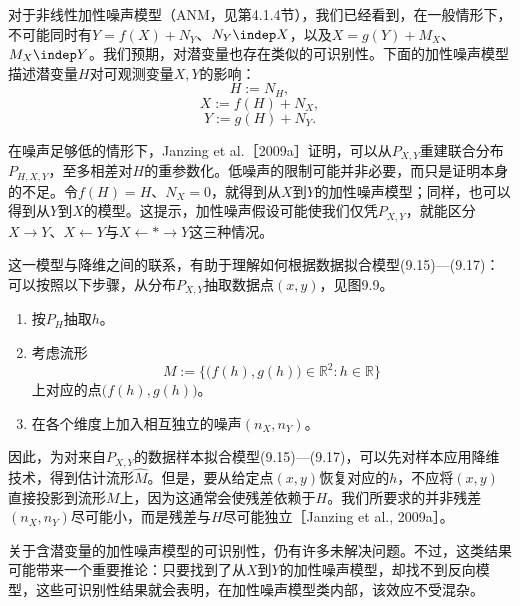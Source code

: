对于非线性加性噪声模型（ANM，见第4.1.4节），我们已经看到，在一般情形下，不可能同时有$Y=f(X)+N_Y$、$N_Y\indep X$，以及$X=g(Y)+M_X$、$M_X\indep Y$。我们预期，对潜变量也存在类似的可识别性。下面的加性噪声模型描述潜变量$H$对可观测变量$X,Y$的影响：
\begin{equation}
 H:=N_H,\tag{9.15}
\end{equation}
\begin{equation}
 X:=f(H)+N_X,\tag{9.16}
\end{equation}
\begin{equation}
 Y:=g(H)+N_Y.\tag{9.17}
\end{equation}

在噪声足够低的情形下，Janzing et al.［2009a］证明，可以从$P_{X,Y}$重建联合分布$P_{H,X,Y}$，至多相差对$H$的重参数化。低噪声的限制可能并非必要，而只是证明本身的不足。令$f(H)=H$、$N_X=0$，就得到从$X$到$Y$的加性噪声模型；同样，也可以得到从$Y$到$X$的模型。这提示，加性噪声假设可能使我们仅凭$P_{X,Y}$，就能区分$X\to Y$、$X\leftarrow Y$与$X\leftarrow *\to Y$这三种情况。

这一模型与降维之间的联系，有助于理解如何根据数据拟合模型(9.15)—(9.17)：可以按照以下步骤，从分布$P_{X,Y}$抽取数据点$(x,y)$，见图9.9。
\begin{enumerate}[label=\arabic*.]
 \item 按$P_H$抽取$h$。
 \item 考虑流形
 \begin{equation}
 M:=\bigl\{\bigl(f(h),g(h)\bigr)\in\mathbb R^2:h\in\mathbb R\bigr\}
 \tag{9.18}
 \end{equation}
 上对应的点$\bigl(f(h),g(h)\bigr)$。
 \item 在各个维度上加入相互独立的噪声$(n_X,n_Y)$。
\end{enumerate}


因此，为对来自$P_{X,Y}$的数据样本拟合模型(9.15)—(9.17)，可以先对样本应用降维技术，得到估计流形$\widehat M$。但是，要从给定点$(x,y)$恢复对应的$h$，不应将$(x,y)$直接投影到流形$M$上，因为这通常会使残差依赖于$H$。我们所要求的并非残差$(n_X,n_Y)$尽可能小，而是残差与$H$尽可能独立［Janzing et al., 2009a］。

关于含潜变量的加性噪声模型的可识别性，仍有许多未解决问题。不过，这类结果可能带来一个重要推论：只要找到了从$X$到$Y$的加性噪声模型，却找不到反向模型，这些可识别性结果就会表明，在加性噪声模型类内部，该效应不受混杂。
\FloatBarrier
